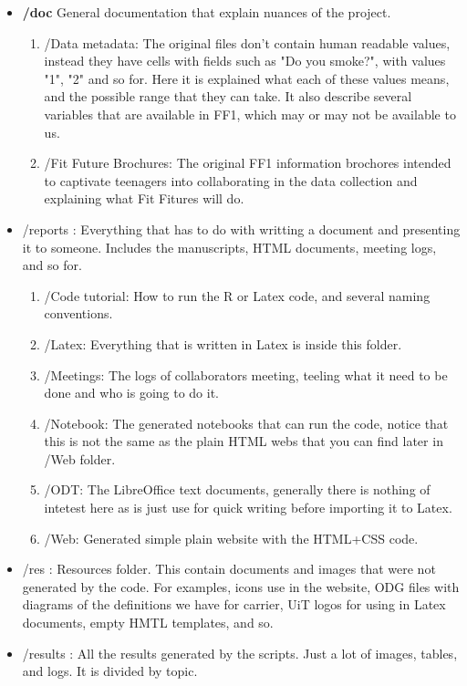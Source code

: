 \begin{itemize}
	
   	\item[] \textbf{/doc} General documentation that explain nuances of the project.
    \begin{enumerate}
		\item /Data metadata: The original files don't contain human readable values, instead they have cells with fields such as "Do you smoke?", with values "1", "2" and so for. Here it is explained what each of these values means, and the possible range that they can take. It also describe several variables that are available in FF1, which may or may not be available to us.
		\item /Fit Future Brochures: The original FF1 information brochores intended to captivate teenagers into collaborating in the data collection and explaining what Fit Fitures will do.
	\end{enumerate}           	

   	\item /reports : Everything that has to do with writting a document and presenting it to someone. Includes the manuscripts, HTML documents, meeting logs, and so for.
	\begin{enumerate}
		\item /Code tutorial: How to run the R or Latex code, and several naming conventions.
		\item /Latex: Everything that is written in Latex is inside this folder.
		\item /Meetings: The logs of collaborators meeting, teeling what it need to be done and who is going to do it.
		\item /Notebook: The generated notebooks that can run the code, notice that this is not the same as the plain HTML webs that you can find later in /Web folder.
		\item /ODT: The LibreOffice text documents, generally there is nothing of intetest here as is just use for quick writing before importing it to Latex.
		\item /Web: Generated simple plain website with the HTML+CSS code.
	\end{enumerate}           	   	
   	
	\item /res : Resources folder. This contain documents and images that were not generated by the code. For examples, icons use in the website, ODG files with diagrams of the definitions we have for carrier, UiT logos for using in Latex documents, empty HMTL templates, and so.
   	
	\item /results : All the results generated by the scripts. Just a lot of images, tables, and logs. It is divided by topic.


\end{itemize}
